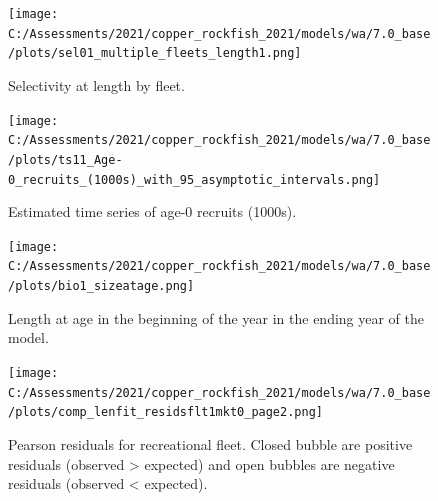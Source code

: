 \documentclass[11pt,
  english,
  a4paper,
]{article}
\begin{document}
\tagmcend\tagstructend


\begin{figure}
\centering
\texttt{[image: C:/Assessments/2021/copper\_rockfish\_2021/models/wa/7.0\_base/plots/sel01\_multiple\_fleets\_length1.png]}
\caption{Selectivity at length by fleet.\label{fig:selex}}
\end{figure}

\tagmcend\tagstructend


\begin{figure}
\centering
\texttt{[image: C:/Assessments/2021/copper\_rockfish\_2021/models/wa/7.0\_base/plots/ts11\_Age-0\_recruits\_(1000s)\_with\_95\_asymptotic\_intervals.png]}
\caption{Estimated time series of age-0 recruits (1000s).\label{fig:recruits}}
\end{figure}

\tagmcend\tagstructend


\begin{figure}
\centering
\texttt{[image: C:/Assessments/2021/copper\_rockfish\_2021/models/wa/7.0\_base/plots/bio1\_sizeatage.png]}
\caption{Length at age in the beginning of the year in the ending year of the model.\label{fig:len-age-ss}}
\end{figure}

\tagmcend\tagstructend


\begin{figure}
\centering
\texttt{[image: C:/Assessments/2021/copper\_rockfish\_2021/models/wa/7.0\_base/plots/comp\_lenfit\_residsflt1mkt0\_page2.png]}
\caption{Pearson residuals for recreational fleet. Closed bubble are positive residuals (observed \textgreater{} expected) and open bubbles are negative residuals (observed \textless{} expected).\label{fig:rec-pearson}}
\end{figure}
\end{document}
